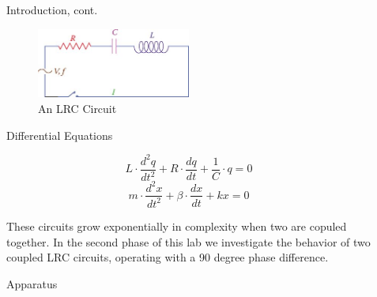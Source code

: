 \documentclass[final]{beamer}
\newlength{\sepwid}
\newlength{\onecolwid}
\begin{document}
\begin{frame}[t]
\begin{columns}[t]
\begin{column}{\onecolwid}


    \end{column}

    \begin{column}{\sepwid}\end{column}			%
    \begin{column}{\onecolwid}
    \begin{block}{Introduction, cont.}

	\begin{alertblock}{ }
	\begin{figure}[h]
	\includegraphics[width=0.5\textwidth]{../Images/l6_LRC.jpg}
	\caption{\label{figA} An LRC Circuit}
	\end{figure}
	\end{alertblock}

	\begin{alertblock}{Differential Equations}
		\begin{semiverbatim}
		$$ L \cdot \frac{d^2q}{dt^2} + R \cdot \frac{dq}{dt} + \frac{1}{C} \cdot q = 0 $$
		$$ m \cdot \frac{d^2x}{dt^2} + \beta \cdot \frac{dx}{dt} + kx = 0 $$
		\end{semiverbatim}
	\end{alertblock}

	These circuits grow exponentially in complexity when two are copuled 
	together. In the second phase of this lab we investigate the behavior
	of two coupled LRC circuits, operating with a 90 degree phase difference.

      \end{block}

      \begin{block}{Apparatus}


\end{block}
\end{column}
\end{columns}
\end{frame}
\end{document}

